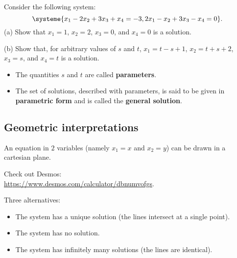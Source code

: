 \documentclass[20pt,a4paper]{extarticle}
\newcounter{example}[section]
\newcounter{definition}
\begin{document}
\newpage 

\begin{example}
Consider the following system:
	\[
		\systeme{x_1 - 2x_2 + 3x_3 + x_4 = -3, 2x_1 - x_2 + 3x_3 - x_4 = 0} .
	\]
(a) Show that $x_1 = 1$, $x_2 = 2$, $x_3=0$, and $x_4 = 0$ is a solution. 

(b) Show that, for arbitrary values of $s$ and $t$, $x_1 = t - s + 1$, $x_2 = t + s + 2$, $x_3 = s$, and $x_4 = t$ is a solution.	
\end{example}

\begin{solution}

\end{solution}

\vfill 

\begin{definition}

\begin{itemize}
	\item The quantities $s$ and $t$ are called \textbf{parameters}.
	\item The set of solutions, described with parameters, is said to be given in \textbf{parametric form} and is called the \textbf{general solution}.
\end{itemize}

\end{definition}

\newpage 


\subsection*{Geometric interpretations}

An equation in $2$ variables (namely $x_1 = x$ and $x_2 = y$) can be drawn in a cartesian plane.

Check out Desmos: \\ 
\url{https://www.desmos.com/calculator/dbnumvofgs}.

Three alternatives:
	\begin{itemize}
		\item The system has a unique solution (the lines intersect at a single point).
		\item The system has no solution.
		\item The system has infinitely many solutions (the lines are identical). 
	\end{itemize}
\end{document}
